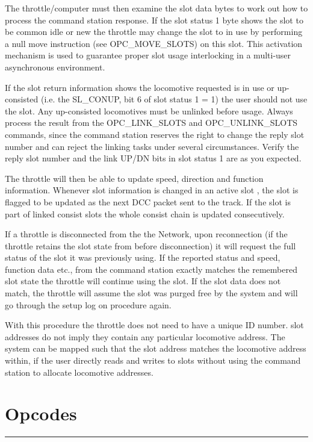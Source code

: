 The throttle/computer must then examine the slot data bytes to work out how to process the command station response. If the slot status 1 byte shows the slot to be common idle or new the throttle may change the slot to in use by performing a null move instruction (see OPC\_MOVE\_SLOTS) on this slot. This activation mechanism is used to guarantee proper slot usage interlocking in a multi-user asynchronous environment.

If the slot return information shows the locomotive requested is in use or up-consisted (i.e. the SL\_CONUP, bit 6 of slot status 1 = 1) the user should not use the slot. Any up-consisted locomotives must be unlinked before usage. Always process the result from the OPC\_LINK\_SLOTS and OPC\_UNLINK\_SLOTS commands, since the command station reserves the right to change the reply slot number and can reject the linking tasks under several circumstances. Verify the reply slot number and the link UP/DN bits in slot status 1 are as you expected.

The throttle will then be able to update speed, direction and function information. Whenever slot information is changed in an active slot , the slot is flagged to be updated as the next DCC packet sent to the track. If the slot is part of linked consist slots the whole consist chain is updated consecutively.

If a throttle is disconnected from the the Network, upon reconnection (if the throttle retains the slot state from before disconnection) it will request the full status of the slot it was previously using. If the reported status and speed, function data etc., from the command station exactly matches the remembered slot state the throttle will continue using the slot. If the slot data does not match, the throttle will assume the slot was purged free by the system and will go through the setup log on procedure again.

With this procedure the throttle does not need to have a unique ID number. slot addresses do not imply they contain any particular locomotive address. The system can be mapped such that the slot address matches the locomotive address within, if the user directly reads and writes to slots without using the command station to allocate locomotive addresses.

\section{Opcodes}

\rule{15.1cm}{0.4pt}
